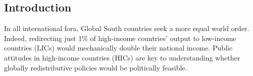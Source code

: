 \documentclass[12pt,english]{article}
\begin{document}
\begin{bibunit}

\section{Introduction}\label{sec:intro}%

In all international fora, Global South countries seek %
a more equal world order. Indeed, redirecting just 1\% of high-income countries' output to low-income countries (LICs) would mechanically double their national income.%
Public attitudes in high-income countries (HICs) are key to understanding whether globally redistributive policies would be politically feasible. 

\end{bibunit}
\end{document}
